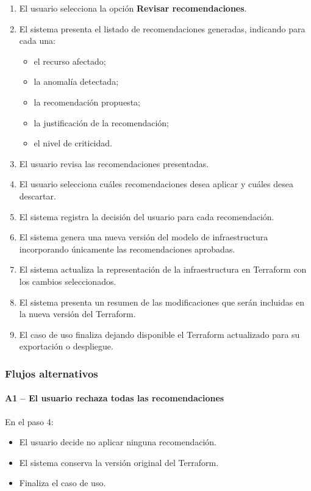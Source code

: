 \begin{enumerate}
\item El usuario selecciona la opción \textbf{Revisar recomendaciones}.
\item El sistema presenta el listado de recomendaciones generadas, indicando para cada una:
  \begin{itemize}
  \item el recurso afectado;
  \item la anomalía detectada;
  \item la recomendación propuesta;
  \item la justificación de la recomendación;
  \item el nivel de criticidad.
  \end{itemize}
\item El usuario revisa las recomendaciones presentadas.
\item El usuario selecciona cuáles recomendaciones desea aplicar y cuáles desea descartar.
\item El sistema registra la decisión del usuario para cada recomendación.
\item El sistema genera una nueva versión del modelo de infraestructura incorporando únicamente las recomendaciones aprobadas.
\item El sistema actualiza la representación de la infraestructura en Terraform con los cambios seleccionados.
\item El sistema presenta un resumen de las modificaciones que serán incluidas en la nueva versión del Terraform.
\item El caso de uso finaliza dejando disponible el Terraform actualizado para su exportación o despliegue.
\end{enumerate}

\subsubsection*{Flujos alternativos}

\paragraph{A1 -- El usuario rechaza todas las recomendaciones}

En el paso 4:

\begin{itemize}
\item El usuario decide no aplicar ninguna recomendación.
\item El sistema conserva la versión original del Terraform.
\item Finaliza el caso de uso.
\end{itemize}

